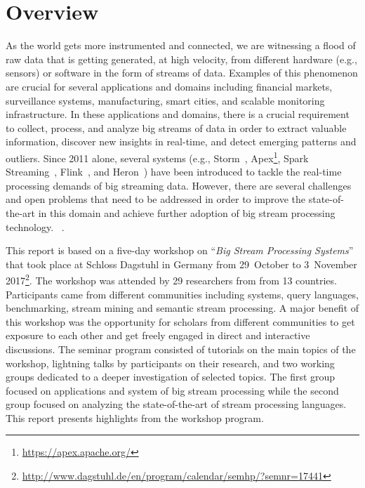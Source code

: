 \section{Overview}\label{sec:overview}

As the world gets more instrumented and connected, we are witnessing a
flood of raw data that is getting generated, at high velocity,
from different hardware (e.g., sensors) or software in the form of
streams of data. Examples of this phenomenon are crucial for several
applications and domains including financial markets, surveillance
systems, manufacturing, smart cities, and scalable monitoring
infrastructure. In these applications and domains, there is a crucial
requirement to collect, process, and analyze big streams of data in
order to extract valuable information, discover new insights in
real-time, and detect emerging patterns and outliers. Since 2011
alone, several systems (e.g.,
\textsf{Storm}~\cite{toshniwal_et_al_2014},
\textsf{Apex}\footnote{\url{https://apex.apache.org/}},
\textsf{Spark Streaming}~\cite{zaharia_et_al_2013},
\textsf{Flink}~\cite{carbone_et_al_2015}, and
\textsf{Heron}~\cite{kulkarni_et_al_2015}) have
been introduced to tackle the real-time processing demands of big streaming data. However, there are several challenges and open problems that need to be addressed in order to improve the state-of-the-art in this domain and achieve further adoption of big stream processing technology. ~\cite{sakr2016big}.

This report is based on a five-day workshop on ``\emph{Big Stream
  Processing Systems}'' that took place at Schloss Dagstuhl in Germany
from 29~October to 3~November 2017\footnote{\url{http://www.dagstuhl.de/en/program/calendar/semhp/?semnr=17441}}. The workshop was attended by 29 researchers from from 13 countries. Participants came from different communities including systems, query languages, benchmarking, stream mining and semantic stream processing. A major benefit of this workshop was the opportunity for scholars from different communities to get exposure to each other and get freely engaged in direct and interactive discussions. The seminar program consisted of tutorials on the main topics of the workshop, lightning talks by participants on their research, and two working groups dedicated to a deeper investigation of selected topics. The first group focused on applications and system of big stream processing while the second group focused on analyzing the state-of-the-art of stream processing languages. This report presents highlights from the workshop program.
